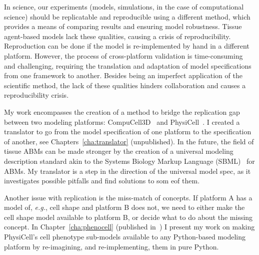 In science, our experiments (models, simulations, in the case of computational science) should be replicatable and reproducible using a different method, which provides a means of comparing results and ensuring model robustness. Tissue agent-based models lack these qualities, causing a crisis of reproducibility. Reproduction can be done if the model is re-implemented by hand in a different platform. However, the process of cross-platform validation is time-consuming and challenging, requiring the translation and adaptation of model specifications from one framework to another. Besides being an imperfect application of the scientific method, the lack of these qualities hinders collaboration and causes a reproducibility crisis.

My work encompasses the creation of a method to bridge the replication gap between two modeling platforms: CompuCell3D~\cite{swat_multi-scale_2012} and PhysiCell~\cite{ghaffarizadeh_physicell_2018}. I created a translator to go from the model specification of one platform to the specification of another, see Chapters~\ref{cha:translator} (unpublished). In the future, the field of tissue ABMs can be made stronger by the creation of a universal modeling description standard akin to the Systems Biology Markup Language (SBML)~\cite{hucka_systems_2003} for ABMs. My translator is a step in the direction of the universal model spec, as it investigates possible pitfalls and find solutions to som eof them.

Another issue with replication is the miss-match of concepts. If platform A has a model of, \textit{e.g.}, cell shape and platform B does not, we need to either make the cell shape model available to platform B, or decide what to do about the missing concept. In Chapter~\ref{cha:phenocell} (published in~\cite{gianlupi_phenocellpy_2023}) I present my work on making PhysiCell's cell phenotype sub-models available to any Python-based modeling platform by re-imagining, and re-implementing, them in pure Python.



